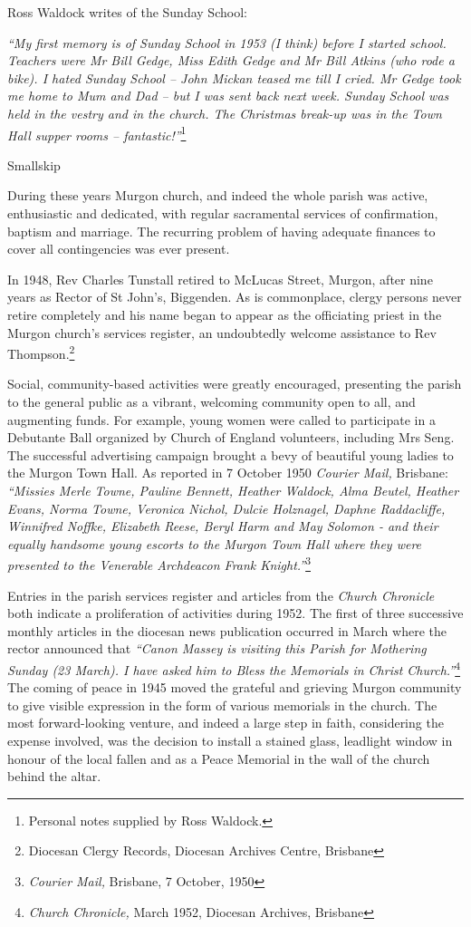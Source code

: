 Ross Waldock writes of the Sunday School:

\emph{``My first memory is of Sunday School in 1953 (I think) before I started school. Teachers were Mr Bill Gedge, Miss Edith Gedge and Mr Bill Atkins (who rode a bike). I hated Sunday School -- John Mickan teased me till I cried. Mr Gedge took me home to Mum and Dad -- but I was sent back next week. Sunday School was held in the vestry and in the church. The Christmas break-up was in the Town Hall supper rooms -- fantastic!''}\footnote{Personal notes supplied by Ross Waldock.}

Smallskip

During these years Murgon church, and indeed the whole parish was active, enthusiastic and dedicated, with regular sacramental services of confirmation, baptism and marriage. The recurring problem of having adequate finances to cover all contingencies was ever present.

In 1948, Rev Charles Tunstall retired to McLucas Street, Murgon, after nine years as Rector of St John's, Biggenden. As is commonplace, clergy persons never retire completely and his name began to appear as the officiating priest in the Murgon church's services register, an undoubtedly welcome assistance to Rev Thompson.\footnote{Diocesan Clergy Records, Diocesan Archives Centre, Brisbane}

Social, community-based activities were greatly encouraged, presenting the parish to the general public as a vibrant, welcoming community open to all, and augmenting funds. For example, young women were called to participate in a Debutante Ball organized by Church of England volunteers, including Mrs Seng. The successful advertising campaign brought a bevy of beautiful young ladies to the Murgon Town Hall. As reported in 7 October 1950 \emph{Courier Mail,} Brisbane: \emph{``Missies Merle Towne, Pauline Bennett, Heather Waldock, Alma Beutel, Heather Evans, Norma Towne, Veronica Nichol, Dulcie Holznagel, Daphne Raddacliffe, Winnifred Noffke, Elizabeth Reese, Beryl Harm and May Solomon - and their equally handsome young escorts to the Murgon Town Hall where they were presented to the Venerable Archdeacon Frank Knight.''}\footnote{\emph{Courier Mail,} Brisbane, 7 October, 1950}

Entries in the parish services register and articles from the \emph{Church Chronicle} both indicate a proliferation of activities during 1952. The first of three successive monthly articles in the diocesan news publication occurred in March where the rector announced that \emph{``Canon Massey is visiting this Parish for Mothering Sunday (23 March). I have asked him to Bless the Memorials in Christ Church.''}\footnote{\emph{Church Chronicle,} March 1952, Diocesan Archives, Brisbane} The coming of peace in 1945 moved the grateful and grieving Murgon community to give visible expression in the form of various memorials in the church. The most forward-looking venture, and indeed a large step in faith, considering the expense involved, was the decision to install a stained glass, leadlight window in honour of the local fallen and as a Peace Memorial in the wall of the church behind the altar.

